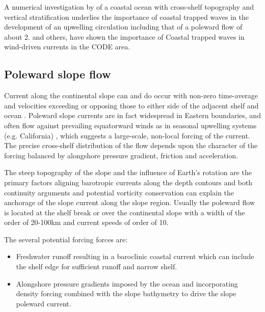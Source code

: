 A numerical investigation by \citet{Suginohara74,Suginohara82} of
a coastal ocean with cross-shelf topography and vertical
stratification underlies the importance of coastal trapped waves
in the development of an upwelling circulation including that of a
poleward flow of about 2\velc. \citet{Denbo87} and others, have
shown the importance of Coastal trapped waves in wind-driven
currents in the CODE area.

\subsection{Poleward slope flow}
Current along the continental slope can and do occur with non-zero
time-average and velocities exceeding or opposing those to either
side of the adjacent shelf and ocean \citep{Huthnance95}. Poleward
slope currents are in fact widespread in Eastern boundaries, and
often flow against prevailing equatorward winds as in seasonal
upwelling systems (e.g. California) , which suggests a
large-scale, non-local forcing of the current. The precise
cross-shelf distribution of the flow depends upon the character of
the forcing balanced by alongshore pressure gradient, friction and
acceleration.

The steep topography of the slope and the influence of Earth's
rotation are the primary factors aligning barotropic currents
along the depth contours and both continuity arguments and
potential vorticity conservation can explain the anchorage of the
slope current along the slope region. Usually the poleward flow is
located at the shelf break or over the continental slope with a
width of the order of 20-100km and current speeds of order of
10\velc.

The several potential forcing forces are:
\begin{itemize}
  \item Freshwater runoff resulting in a baroclinic coastal current
\citep{Hill98} which can include the shelf edge for sufficient
runoff and narrow shelf.
  \item Alongshore pressure gradients imposed by the ocean and
incorporating density forcing combined with the slope bathymetry
to drive the slope poleward current.
\end{itemize}


